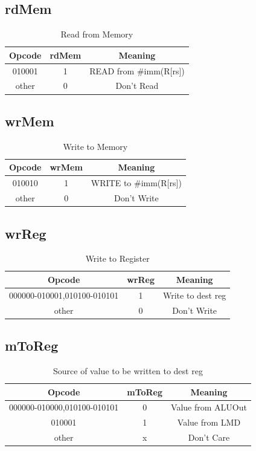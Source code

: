 \documentclass{article}
\begin{document}
\subsection{rdMem}
\begin{table}[H]
    \centering
    \begin{tabular}{|c|c|c|}
        \hline
        \textbf{Opcode} & \textbf{rdMem} & \textbf{Meaning} \\
        \hline
        010001 & 1 & READ from \#imm(R[rs]) \\
        other & 0 & Don't Read \\
        \hline
    \end{tabular}
    \caption{Read from Memory}
\end{table}

\subsection{wrMem}
\begin{table}[H]
    \centering
    \begin{tabular}{|c|c|c|}
        \hline
        \textbf{Opcode} & \textbf{wrMem} & \textbf{Meaning} \\
        \hline
        010010 & 1 & WRITE to \#imm(R[rs]) \\
        other & 0 & Don't Write \\
        \hline
    \end{tabular}
    \caption{Write to Memory}
\end{table}

\subsection{wrReg}
\begin{table}[H]
    \centering
    \begin{tabular}{|c|c|c|}
        \hline
        \textbf{Opcode} & \textbf{wrReg} & \textbf{Meaning} \\
        \hline
        000000-010001,010100-010101 & 1 & Write to dest reg \\
        other & 0 & Don't Write \\
        \hline
    \end{tabular}
    \caption{Write to Register}
\end{table}

\subsection{mToReg}
\begin{table}[H]
    \centering
    \begin{tabular}{|c|c|c|}
        \hline
        \textbf{Opcode} & \textbf{mToReg} & \textbf{Meaning} \\
        \hline
        000000-010000,010100-010101 & 0 & Value from ALUOut \\
        010001 & 1 & Value from LMD \\
        other & x & Don't Care \\
        \hline
    \end{tabular}
    \caption{Source of value to be written to dest reg}
\end{table}
\end{document}
